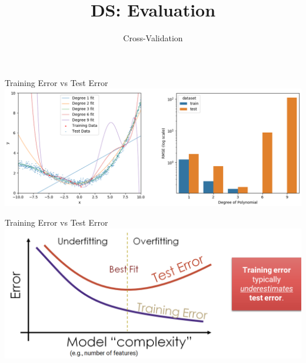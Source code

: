 \documentclass[aspectratio=169]{../latex_main/tntbeamer}  %
\title[Evaluation]{DS: Evaluation}
\subtitle{Cross-Validation}
\begin{document}
	
	\maketitle
	\begin{frame}{Training Error vs Test Error}
	    \includegraphics[scale=.4]{Bild1}
	\end{frame}
	
	
	\begin{frame}{Training Error vs Test Error}
	    \includegraphics[scale=.4]{Bild2}
	\end{frame}
	
\end{document}

